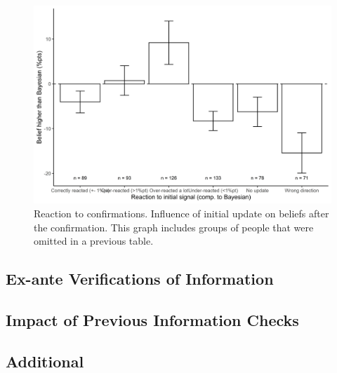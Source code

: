 \documentclass{article}
\begin{document}


\begin{figure}[!htb]
    \centering
    \includegraphics[width=12cm]{Fig/02_fig_confirm_diff.jpg}
    \caption{Reaction to confirmations. Influence of initial update on beliefs after the confirmation. This graph includes groups of people that were omitted in a previous table.}
    \label{fig:confirm_diff_complete}
\end{figure}


\newpage
\subsection{Ex-ante Verifications of Information}






\newpage
\subsection{Impact of Previous Information Checks}






\newpage
\subsection{Additional}
\end{document}
